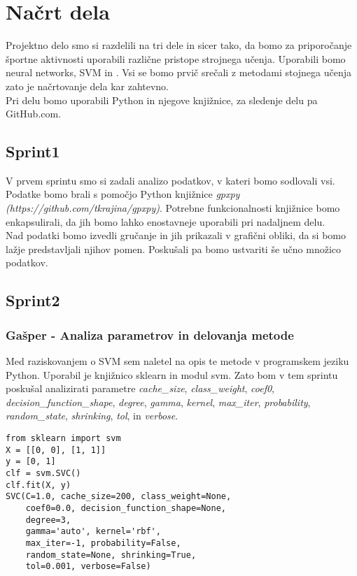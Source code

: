 \documentclass[a4paper,11pt]{article}
\begin{document}
\section{Načrt dela}

Projektno delo smo si razdelili na tri dele in sicer tako, da bomo za priporočanje športne aktivnosti uporabili različne pristope strojnega učenja. 
Uporabili bomo neural networks, SVM in . 
Vsi se bomo prvič srečali z metodami stojnega učenja zato je načrtovanje dela kar zahtevno. \\
Pri delu bomo uporabili Python in njegove knjižnice, za sledenje delu pa GitHub.com. 

\subsection{Sprint1}
V prvem sprintu smo si zadali analizo podatkov, v kateri bomo sodlovali vsi. Podatke bomo brali s pomočjo Python knjižnice \textit{gpxpy (https://github.com/tkrajina/gpxpy)}. Potrebne funkcionalnosti knjižnice bomo enkapsulirali, da jih bomo lahko enostavneje uporabili pri nadaljnem delu.\\ Nad podatki bomo izvedli gručanje in jih prikazali v grafični obliki, da si bomo lažje predstavljali njihov pomen. Poskušali pa bomo ustvariti še učno množico podatkov.


\subsection{Sprint2}
\subsubsection{Gašper - Analiza parametrov in delovanja metode}
Med raziskovanjem o SVM sem naletel na opis te metode v programskem jeziku Python. Uporabil je knjižnico sklearn in modul svm. Zato bom v tem sprintu poskušal analizirati parametre \textit{cache_size}, \textit{class_weight}, \textit{coef0}, \textit{decision_function_shape}, \textit{degree}, \textit{gamma}, \textit{kernel}, \textit{max_iter}, \textit{probability}, \textit{random_state}, \textit{shrinking}, \textit{tol}, in \textit{verbose}. \\

\begin{lstlisting}[caption={Uporaba SVM v Pythonu},captionpos=b]
from sklearn import svm
X = [[0, 0], [1, 1]]
y = [0, 1]
clf = svm.SVC()
clf.fit(X, y)  
SVC(C=1.0, cache_size=200, class_weight=None, 
	coef0=0.0, decision_function_shape=None, 
	degree=3,
    gamma='auto', kernel='rbf',
    max_iter=-1, probability=False, 
    random_state=None, shrinking=True,
    tol=0.001, verbose=False)
\end{lstlisting}
\end{document}
